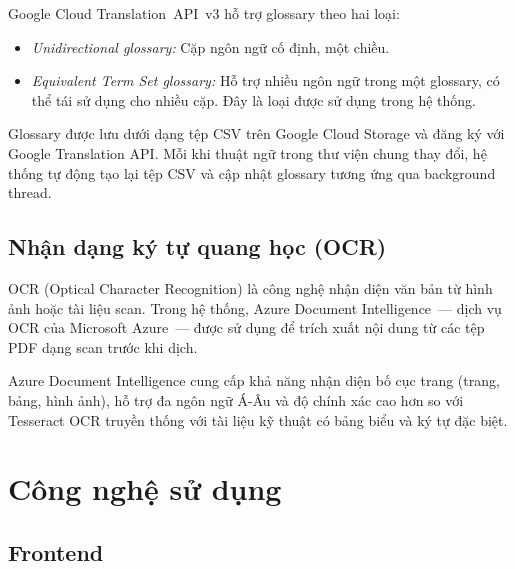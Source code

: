 Google Cloud Translation~API~v3 hỗ trợ glossary theo hai loại:
\begin{itemize}
  \item \textit{Unidirectional glossary:} Cặp ngôn ngữ cố định, một chiều.
  \item \textit{Equivalent Term Set glossary:} Hỗ trợ nhiều ngôn ngữ trong một glossary,
    có thể tái sử dụng cho nhiều cặp. Đây là loại được sử dụng trong hệ thống.
\end{itemize}

Glossary được lưu dưới dạng tệp CSV trên Google Cloud Storage và đăng ký với Google Translation
API. Mỗi khi thuật ngữ trong thư viện chung thay đổi, hệ thống tự động tạo lại tệp CSV và cập
nhật glossary tương ứng qua background thread.

\subsection{Nhận dạng ký tự quang học (OCR)}

OCR (Optical Character Recognition) là công nghệ nhận diện văn bản từ hình ảnh hoặc tài liệu
scan. Trong hệ thống, Azure Document Intelligence~--- dịch vụ OCR của Microsoft Azure~--- được
sử dụng để trích xuất nội dung từ các tệp PDF dạng scan trước khi dịch.

Azure Document Intelligence cung cấp khả năng nhận diện bố cục trang (trang, bảng, hình ảnh),
hỗ trợ đa ngôn ngữ Á-Âu và độ chính xác cao hơn so với Tesseract OCR truyền thống với tài
liệu kỹ thuật có bảng biểu và ký tự đặc biệt.

\section{Công nghệ sử dụng}

\subsection{Frontend}

